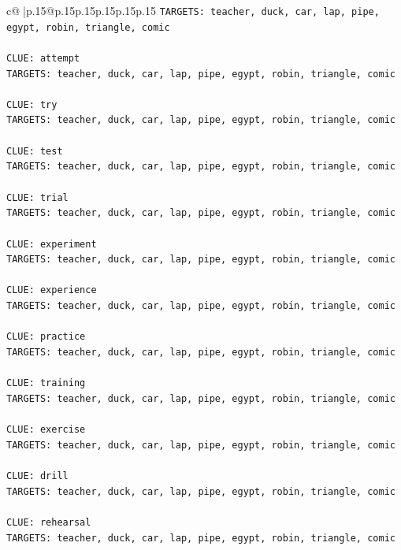 \documentclass{article}
\begin{document}
{\begin{supertabular}{c@{$\;$}|p{.15\linewidth}@{}p{.15\linewidth}p{.15\linewidth}p{.15\linewidth}p{.15\linewidth}p{.15\linewidth}}
{{{\texttt{TARGETS: teacher, duck, car, lap, pipe, egypt, robin, triangle, comic} \\
\\ 
\texttt{CLUE: attempt} \\
\texttt{TARGETS: teacher, duck, car, lap, pipe, egypt, robin, triangle, comic} \\
\\ 
\texttt{CLUE: try} \\
\texttt{TARGETS: teacher, duck, car, lap, pipe, egypt, robin, triangle, comic} \\
\\ 
\texttt{CLUE: test} \\
\texttt{TARGETS: teacher, duck, car, lap, pipe, egypt, robin, triangle, comic} \\
\\ 
\texttt{CLUE: trial} \\
\texttt{TARGETS: teacher, duck, car, lap, pipe, egypt, robin, triangle, comic} \\
\\ 
\texttt{CLUE: experiment} \\
\texttt{TARGETS: teacher, duck, car, lap, pipe, egypt, robin, triangle, comic} \\
\\ 
\texttt{CLUE: experience} \\
\texttt{TARGETS: teacher, duck, car, lap, pipe, egypt, robin, triangle, comic} \\
\\ 
\texttt{CLUE: practice} \\
\texttt{TARGETS: teacher, duck, car, lap, pipe, egypt, robin, triangle, comic} \\
\\ 
\texttt{CLUE: training} \\
\texttt{TARGETS: teacher, duck, car, lap, pipe, egypt, robin, triangle, comic} \\
\\ 
\texttt{CLUE: exercise} \\
\texttt{TARGETS: teacher, duck, car, lap, pipe, egypt, robin, triangle, comic} \\
\\ 
\texttt{CLUE: drill} \\
\texttt{TARGETS: teacher, duck, car, lap, pipe, egypt, robin, triangle, comic} \\
\\ 
\texttt{CLUE: rehearsal} \\
\texttt{TARGETS: teacher, duck, car, lap, pipe, egypt, robin, triangle, comic} \\
}}}
\end{supertabular}}
\end{document}

